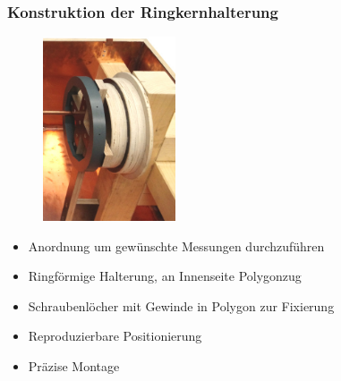 \documentclass[accentcolor=tud9b, colorbacktitle, inverttitle]{tudbeamer}
\begin{document}
\begin{frame}\frametitle{Konstruktion der Ringkernhalterung}
\vspace{-1em}
\begin{multicols}{2}
	\begin{figure}[h]
		\centering
		\includegraphics[width=0.35\textwidth]{BoxKreuzPolygonpraes}
	\end{figure}
	\vfill\null
	\columnbreak
	\begin{itemize}
		\item Anordnung um gew\"unschte Messungen durchzuf\"uhren
		\item Ringf\"ormige Halterung, an Innenseite Polygonzug
		\item Schraubenl\"ocher mit Gewinde in Polygon zur Fixierung
		\item Reproduzierbare Positionierung
		\item Pr\"azise Montage
	\end{itemize}
\end{multicols}
\end{frame}
\end{document}
